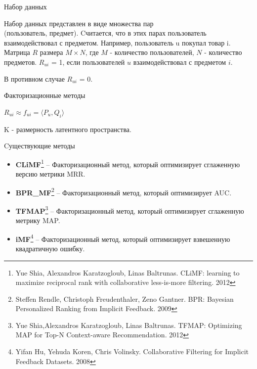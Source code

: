 \documentclass[10pt,pdf,hyperref={unicode}]{beamer}
\begin{document}
\begin{frame}{Набор данных}

	Набор данных представлен в виде множества пар \\(пользователь, предмет). Cчитается, что в этих парах пользователь взаимодействовал с предметом. Например, пользователь u покупал товар i.
	\bigbreak
 Матрица $R$ размера $M \times N$, где $M$ - количество пользователей, $N$ - количество предметов. $R_{ui}$ = 1, если пользователей $u$ взаимодействовал с предметом $i$.
 
  В противном случае $R_{ui}$ = 0.

%
\end{frame}

\begin{frame}{Факторизационные методы}

\begin{figure}[h]
\label{pic:latexpic}
\end{figure}

\begin{center}
$R_{ui} \approx f_{ui} = \langle P_u, Q_i \rangle$
\end{center}

\begin{center}
K  - размерность латентного пространства.
\end{center}
\end{frame}


\begin{frame}{Cуществующие методы}

\begin{itemize}
\item \textbf{CLiMF}\footnote{Yue Shia, Alexandros Karatzogloub, Linas Baltrunas.
CLiMF: learning to maximize reciprocal rank with collaborative less-is-more filtering. 2012}
 -- Факторизационный метод, который оптимизирует сглаженную версию метрики MRR.
  	
\item \textbf{BPR\_MF}\footnote{Steffen Rendle, Christoph Freudenthaler, Zeno Gantner.    
         BPR: Bayesian Personalized Ranking from Implicit Feedback. 2009}
-- Факторизационный метод, который оптимизирует AUC.
\item \textbf{TFMAP}\footnote{Yue Shia,Alexandros Karatzogloub, Linas Baltrunas.
TFMAP: Optimizing MAP for Top-N Context-aware Recommendation. 2012} 
-- Факторизационный метод, который оптимизирует сглаженную метрику MAP.
\item \textbf{iMF}\footnote{Yifan Hu, Yehuda Koren, Chris Volinsky.
	Collaborative Filtering for Implicit Feedback Datasets. 2008}
-- Факторизационный метод, который оптимизирует взвешенную квадратичную ошибку.
\end{itemize}
\end{frame}
\end{document}

